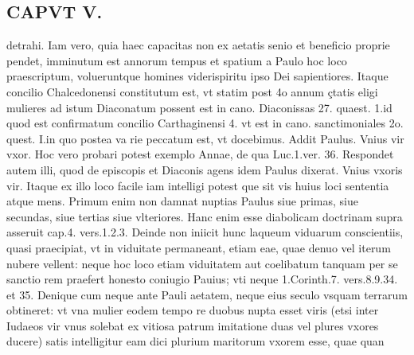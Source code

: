 \documentclass{article}
\begin{document}
\begin{pages}
\section*{CAPVT  V. }
\marginpar{[ p.27 ]}\pstart detrahi. Iam vero, quia haec capacitas non ex aetatis senio et beneficio proprie pendet, imminutum est annorum tempus et spatium a Paulo hoc loco praescriptum, volueruntque homines viderispiritu ipso Dei sapientiores. Itaque concilio Chalcedonensi constitutum est, vt statim post 4o annum çtatis eligi mulieres ad istum Diaconatum possent est in cano. Diaconissas 27. quaest. 1.id quod est confirmatum concilio Carthaginensi 4. vt est in cano. sanctimoniales 2o. quest. I.in quo postea va rie peccatum est, vt docebimus. Addit Paulus. Vnius vir vxor. Hoc vero probari potest exemplo Annae, de qua Luc.1.ver. 36. Respondet autem illi, quod de episcopis et Diaconis agens idem Paulus dixerat. Vnius vxoris vir. Itaque ex illo loco facile iam intelligi potest que sit vis huius loci sententia atque mens. Primum enim non damnat nuptias Paulus siue primas, siue secundas, siue tertias siue vlteriores. Hanc enim esse diabolicam doctrinam supra asseruit cap.4. vers.1.2.3. Deinde non iniicit hunc laqueum viduarum conscientiis, quasi praecipiat, vt in viduitate permaneant, etiam eae, quae denuo vel iterum nubere vellent: neque hoc loco etiam viduitatem aut coelibatum tanquam per se sanctio rem praefert honesto coniugio Pauius; vti neque 1.Corinth.7. vers.8.9.34. et 35. Denique cum neque ante Pauli aetatem, neque eius seculo vsquam terrarum obtineret: vt vna mulier eodem tempo re duobus nupta esset viris (etsi inter Iudaeos vir vnus solebat ex vitiosa patrum imitatione duas vel plures vxores ducere) satis intelligitur eam dici plurium maritorum vxorem esse, quae quan\pend

\end{pages}
\end{document}

